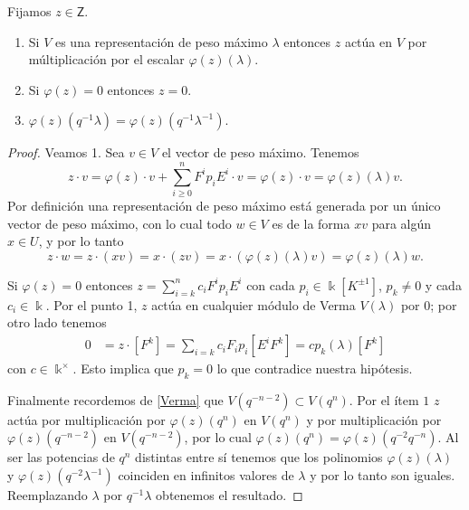 \documentclass[11pt,fleqn]{article}
\renewcommand\k{\Bbbk}
\newcommand\Z{\mathsf Z}
\renewcommand\phi{\varphi}
\begin{document}
\begin{Lemma*}
Fijamos $z \in \Z$.
\begin{enumerate}
\item Si $V$ es una representación de peso máximo $\lambda$ entonces $z$ actúa en 
$V$ por múltiplicación por el escalar $\phi(z)(\lambda)$.

\item Si $\phi(z) = 0$ entonces $z = 0$.

\item $\phi(z)(q^{-1}\lambda) = \phi(z)(q^{-1}\lambda^{-1})$.
\end{enumerate}
\end{Lemma*}
\begin{proof}
Veamos 1.
Sea $v \in V$ el vector de peso máximo. Tenemos
\[
	z \cdot v = \phi(z)\cdot v + \sum_{i\geq 0}^n F^i p_i E^i \cdot v = \phi(z)\cdot v = 
	\phi(z)(\lambda) v.
\]
Por definición una representación de peso máximo está generada por un único vector de 
peso máximo, con lo cual todo $w \in V$ es de la forma $xv$ para algún $x \in U$, y por
lo tanto
\[
	z \cdot w = z \cdot(xv) = x \cdot (z v) = x\cdot(\phi(z)(\lambda)v ) 
		= \phi(z)(\lambda)w.
\]

Si $\phi(z) = 0$ entonces $z = \sum_{i=k}^n c_i F^ip_iE^i$ con cada $p_i \in 
\k[K^{\pm 1}]$, $p_k \neq 0$ y cada $c_i \in \k$. Por el punto 1, $z$ actúa en cualquier 
módulo de Verma $V(\lambda)$ por $0$; por otro lado tenemos
\begin{align*}
0 
	&= z \cdot [F^k]
	= \sum_{i= k} c_i F_i p_i [E^i F^k]
	= c p_k(\lambda) [F^k]
\end{align*}
con $c \in \k^\times$. Esto implica que $p_k = 0$ lo que contradice nuestra hipótesis.

Finalmente recordemos de \ref{Verma} que $V(q^{-n-2}) \subset V(q^{n})$. Por el ítem $1$
$z$ actúa por multiplicación por $\phi(z)(q^n)$ en $V(q^n)$ y por multiplicación por 
$\phi(z)(q^{-n-2})$ en $V(q^{-n-2})$, por lo cual $\phi(z)(q^n) = \phi(z)(q^{-2}q^{-n})$.
Al ser las potencias de $q^n$ distintas entre sí tenemos que los polinomios $\phi(z)
(\lambda)$ y $\phi(z)(q^{-2}\lambda^{-1})$ coinciden en infinitos valores de $\lambda$
y por lo tanto son iguales. Reemplazando $\lambda$ por $q^{-1}\lambda$ obtenemos el
resultado.
\end{proof}
\end{document}
